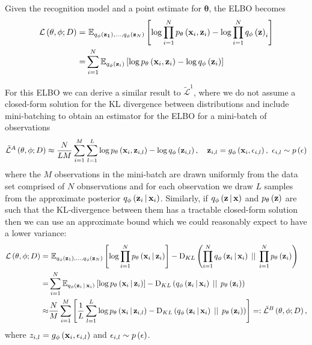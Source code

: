 \documentclass[../report.tex]{subfiles}
\begin{document}
Given the recognition model and a point estimate for $\mathbf{\theta}$, the ELBO becomes
\begin{align}
  \mathcal{L} \left( \mathbf{\theta}, \phi; D\right) =& \,\, \mathbb{E}_{q_\phi \left( \mathbf{z_1}\right),...,q_\phi \left( \mathbf{z}_N\right)} \left[ \log \prod_{i=1}^{N} p_\mathbf{\theta} \left( \mathbf{x}_i, \mathbf{z}_i\right) - \log \prod_{i=1}^{N} q_\phi \left( \mathbf{z}\right)_i \right] \nonumber \\
  =& \sum_{i=1}^{N} \mathbb{E}_{q_\phi \left( \mathbf{z}_i\right)} \left[ \log p_\mathbf{\theta} \left( \mathbf{x}_i, \mathbf{z}_i\right) - \log q_\phi \left( \mathbf{z}_i\right) \right] \nonumber \\
\end{align}

For this ELBO we can derive a similar result to $\tilde{\mathcal{L}}^1$, where we do not assume a closed-form solution for the KL divergence between distributions and include mini-batching to obtain an estimator for the ELBO for a mini-batch of observations
\begin{equation}
  \tilde{\mathcal{L}}^A \left( \mathbf{\theta}, \phi; D\right) \approx \frac{N}{LM} \sum_{i=1}^{M} \sum_{l=1}^{L} \log p_\mathbf{\theta} \left( \mathbf{x}_i, \mathbf{z}_{i,l}\right) - \log q_\phi \left( \mathbf{z}_{i,l}\right), \quad \mathbf{z}_{i,l} = g_\phi \left( \mathbf{x}_i, \mathbf{\epsilon}_{i,l}\right),\,\, \mathbf{\epsilon}_{i,l} \sim p \left( \mathbf{\epsilon}\right)
\end{equation}
where the $M$ observations in the mini-batch are drawn uniformly from the data set comprised of $N$ obnservations and for each observation we draw $L$ samples from the approximate posterior $q_\phi \left(\mathbf{z}_i \, \middle\vert \, \mathbf{x}_i \right)$.
Similarly, if $q_\phi \left(\mathbf{z} \, \middle\vert \, \mathbf{x} \right)$ and $p_\mathbf{\theta} \left( \mathbf{z}\right)$ are such that the KL-divergence between them has a tractable closed-form solution then we can use an approximate bound which we could reasonably expect to have a lower variance:
\begin{align}
  \mathcal{L} \left( \mathbf{\theta}, \phi; D\right) =& \,\,\mathbb{E}_{q_\phi \left( \mathbf{z}_1\right),...,q_\phi \left( \mathbf{z}_N\right)} \left[ \log \prod_{i=1}^{N} p_\mathbf{\theta} \left(\mathbf{x}_i \, \middle\vert \, \mathbf{z}_i \right) \right] - \textrm{D}_{KL} \left( \prod_{i=1}^{N} q_\phi \left(\mathbf{z}_i \, \middle\vert \, \mathbf{x}_i \right) \, \mid \mid \, \prod_{i=1}^{N} p_\mathbf{\theta} \left( \mathbf{z}_i\right)\right) \nonumber \\
  =& \sum_{i=1}^{N} \mathbb{E}_{q_\phi \left(\mathbf{z}_i \, \middle\vert \, \mathbf{x}_i \right)} \left[ \log p_\mathbf{\theta} \left(\mathbf{x}_i \, \middle\vert \, \mathbf{z}_i \right) \right] - \textrm{D}_{KL} \left( q_\phi \left(\mathbf{z}_i \, \middle\vert \, \mathbf{x}_i \right) \, \mid \mid \, p_\mathbf{\theta} \left( \mathbf{z}_i\right)\right) \nonumber \\
  \approx& \frac{N}{M} \sum_{i=1}^{M} \left[ \frac{1}{L} \sum_{l=1}^{L} \log p_\mathbf{\theta} \left(\mathbf{x}_i \, \middle\vert \, \mathbf{z}_{i,l} \right) - \textrm{D}_{KL} \left( q_{\phi} \left(\mathbf{z}_i \, \middle\vert \, \mathbf{x}_i \right) \, \mid \mid \, p_\mathbf{\theta} \left( \mathbf{z}_i\right)\right) \right] =: \tilde{\mathcal{L}}^B \left( \mathbf{\theta}, \phi; D\right), \label{eqn:Lb}
\end{align}
where $z_{i,l} = g_\phi \left( \mathbf{x}_i, \mathbf{\epsilon}_{i,l}\right)$ and $\mathbf{\epsilon}_{i,l} \sim p \left( \mathbf{\epsilon}\right)$.
\end{document}

